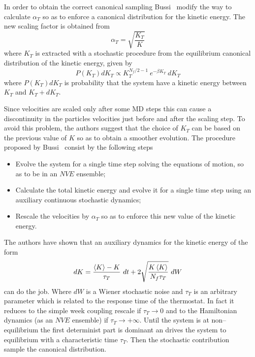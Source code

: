 In order to obtain the correct canonical sampling Bussi \etal\, modify the way to calculate $\alpha_T$ so as to enforce a canonical distribution for the kinetic energy. The new scaling factor is obtained from
\begin{equation*}
	\alpha_{T} = \sqrt{\frac{K_T}{K}}
\end{equation*}
where $K_T$ is extracted with a stochastic procedure from the equilibrium canonical distribution of the kinetic energy, given by
\begin{equation*}
	P(K_T)dK_T \propto K_T^{N_f/2-1}\ e^{-\beta K_T}\ dK_T
\end{equation*}
where $P(K_T)dK_T$ is probability that the system have a kinetic energy between $K_T$ and $K_T + dK_T$.

Since velocities are scaled only after some \ac{MD} steps this can cause a discontinuity in the particles velocities just before and after the scaling step. To avoid this problem, the authors suggest that the choice of $K_T$ can be based on the previous value of $K$ so as to obtain a smoother evolution. The procedure proposed by Bussi \etal\, consist by the following steps
\begin{itemize}
	\item Evolve the system for a single time step solving the equations of motion, so as to be in an $NVE$ ensemble;
	\item Calculate the total kinetic energy and evolve it for a single time step using an auxiliary continuous stochastic dynamics;
	\item Rescale the velocities by $\alpha_T$ so as to enforce this new value of the kinetic energy.
\end{itemize}
The authors have shown that an auxiliary dynamics for the kinetic energy of the form
\begin{equation*}
	dK = \frac{\left \langle K \right \rangle - K}{\tau_T}\ dt + 2 \sqrt{\frac{K\left \langle K \right \rangle}{N_f\tau_T}}\ dW
\end{equation*}
can do the job. Where $dW$ is a Wiener stochastic noise and $\tau_T$ is an arbitrary parameter which is related to the response time of the thermostat. In fact it reduces to the simple week coupling rescale if $\tau_T\rightarrow 0$ and to the Hamiltonian dynamics (as an $NVE$ ensemble) if $\tau_T\rightarrow +\infty$. Until the system is at non--equilibrium the first determinist part is dominant an drives the system to equilibrium with a characteristic time $\tau_T$. Then the stochastic contribution sample the canonical distribution.
 

